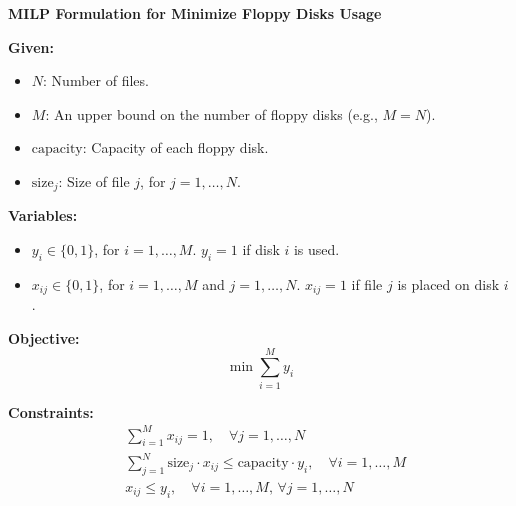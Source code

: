 \documentclass{article}
\begin{document}
\textbf{MILP Formulation for Minimize Floppy Disks Usage}

\textbf{Given:}
\begin{itemize}
    \item $N$: Number of files.
    \item $M$: An upper bound on the number of floppy disks (e.g., $M = N$).
    \item $\text{capacity}$: Capacity of each floppy disk.
    \item $\text{size}_j$: Size of file $j$, for $j = 1, \ldots, N$.
\end{itemize}

\textbf{Variables:}
\begin{itemize}
    \item $y_i \in \{0, 1\}$, for $i = 1, \ldots, M$. $y_i = 1$ if disk $i$ is used.
    \item $x_{ij} \in \{0, 1\}$, for $i = 1, \ldots, M$ and $j = 1, \ldots, N$. $x_{ij} = 1$ if file $j$ is placed on disk $i$.
\end{itemize}

\textbf{Objective:}
\[
\min \sum_{i=1}^{M} y_i
\]

\textbf{Constraints:}
\begin{align}
    & \sum_{i=1}^{M} x_{ij} = 1, \quad \forall j = 1, \ldots, N \\
    & \sum_{j=1}^{N} \text{size}_j \cdot x_{ij} \leq \text{capacity} \cdot y_i, \quad \forall i = 1, \ldots, M \\
    & x_{ij} \leq y_i, \quad \forall i = 1, \ldots, M, \, \forall j = 1, \ldots, N
\end{align}
\end{document}
